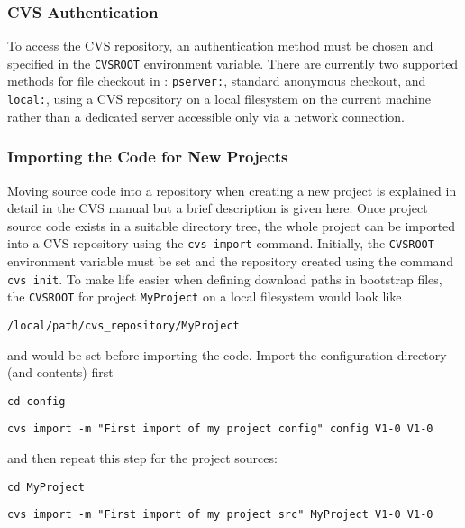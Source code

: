 \subsubsection{CVS Authentication}\label{sec:CVSauth}
To access the CVS repository, an authentication method must be chosen
and specified in the \texttt{CVSROOT} environment variable. There are
currently two supported methods for file checkout in \scram:
\texttt{pserver:}, standard anonymous checkout, and \texttt{local:},
using a CVS repository on a local filesystem on the current machine
rather than a dedicated server accessible only via a network
connection. 

\subsubsection{Importing the Code for New Projects}\label{sec:importingcode}
\ni Moving source code into a repository when creating a new project
is explained in detail in the CVS manual but a brief description is
given here. Once project source code exists in a suitable directory tree, the
whole project can be imported into a CVS repository using 
the \texttt{cvs import} command. Initially, the \texttt{CVSROOT}
environment variable must be set and
the repository created using the command \texttt{cvs init}.
To make life easier when defining download paths in bootstrap
files, the \texttt{CVSROOT} for project \texttt{MyProject} on a local
filesystem would look like

\begin{list}{}
\item\texttt{/local/path/cvs\_repository/MyProject} 
\end{list}

\ni and would be set before importing the code. Import the
configuration directory (and contents) first

\begin{indentprint}\texttt{cd config}\end{indentprint}
\vspace{-3mm}
\begin{indentprint}
  \texttt{cvs import -m "First import of my project config" config V1-0 V1-0}
\end{indentprint}

\ni and then repeat this step for the project sources:

\begin{indentprint}\texttt{cd MyProject}\end{indentprint}
\vspace{-3mm}
\begin{indentprint}
  \texttt{cvs import -m "First import of my project src" MyProject V1-0 V1-0}
\end{indentprint}

